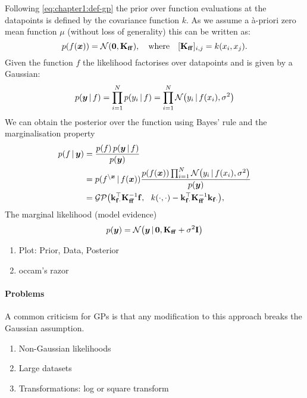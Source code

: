 Following \cref{eq:chapter1:def-gp} the prior over function evaluations at the datapoints is defined by the covariance function $k$. As we assume a \`a-priori zero mean function $\mu$ (without loss of generality) this can be written as:
\begin{equation} 
  p(f(\vx)) = \NormDist{\vzero, \Kff},\quad\text{where}\quad [\Kff]_{i,j} = k(x_i, x_j).
\end{equation}
Given the function $f$ the likelihood factorises over datapoints and is given by a Gaussian:
\begin{equation}
  p(\vy \given f) = \prod_{i=1}^N p(y_i \given f) = \prod_{i=1}^N \NormDist{y_i \given f(x_i), \sigma^2}
\end{equation}
We can obtain the posterior over the function using Bayes' rule and the marginalisation property
\begin{align}
  p(f \given \vy) 
      &= \frac{p(f)\,p(\vy \given f)}{p(\vy)} \\
      &= p(f^{\setminus \vx} \given f(\vx)) \frac{ p(f(\vx)) \prod_{i=1}^N \NormDist{y_i \given f(x_i), \sigma^2}}{p(\vy)} \\
      &= \GP\big(\kfx^\top \Kff^{-1} \vf,\ \ k(\cdot, \cdot) -  \kfx^\top \Kff^{-1} \kfx\big), 
\end{align}
The marginal likelihood (model evidence)
\begin{equation}
  p(\vy) = \NormDist{\vy \given \vzero, \Kff + \sigma^2 \Eye}
\end{equation}

\begin{enumerate}
  \item Plot: Prior, Data, Posterior
  \item occam's razor
\end{enumerate}

\paragraph{Problems}
A common criticism for GPs is that any modification to this approach breaks the Gaussian assumption. 
\begin{enumerate}
  \item Non-Gaussian likelihoods
  \item Large datasets
  \item Transformations: log or square transform
\end{enumerate}

